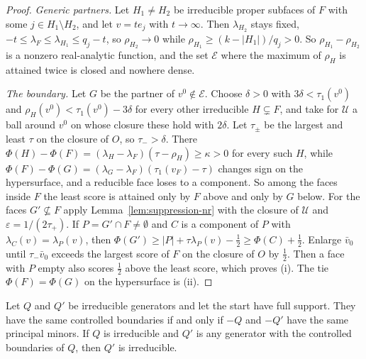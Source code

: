 \begin{proof}
\emph{Generic partners.} Let $H_1\ne H_2$ be irreducible proper subfaces of $F$ with some
$j\in H_1\setminus H_2$, and let $v=te_j$ with $t\to\infty$. Then $\lambda_{H_2}$ stays fixed,
$-t\le\lambda_F\le\lambda_{H_1}\le q_j-t$, so $\rho_{H_2}\to0$ while
$\rho_{H_1}\ge(k-|H_1|)/q_j>0$. So $\rho_{H_1}-\rho_{H_2}$ is a nonzero real-analytic function, and
the set $\mathcal E$ where the maximum of $\rho_H$ is attained twice is closed and nowhere dense.

\emph{The boundary.} Let $G$ be the partner of $v^0\notin\mathcal E$. Choose $\delta>0$ with
$3\delta<\tau_1(v^0)$ and $\rho_H(v^0)<\tau_1(v^0)-3\delta$ for every other irreducible
$H\subsetneq F$, and take for $\mathcal U$ a ball around $v^0$ on whose closure these hold with
$2\delta$. Let $\tau_\pm$ be the largest and least $\tau$ on the closure of $O$, so $\tau_->\delta$.
There $\Phi(H)-\Phi(F)=(\lambda_H-\lambda_F)(\tau-\rho_H)\ge\kappa>0$ for every such $H$, while
$\Phi(F)-\Phi(G)=(\lambda_G-\lambda_F)(\tau_1(v_F)-\tau)$ changes sign on the hypersurface, and a
reducible face loses to a component. So among the faces inside $F$ the least score is attained
only by $F$ above and only by $G$ below. For the faces $G'\not\subseteq F$ apply
Lemma~\ref{lem:suppression-nr} with the closure of $\mathcal U$ and $\varepsilon=1/(2\tau_+)$. If
$P=G'\cap F\ne\emptyset$ and $C$ is a component of $P$ with $\lambda_C(v)=\lambda_P(v)$, then
$\Phi(G')\ge|P|+\tau\lambda_P(v)-\frac12\ge\Phi(C)+\frac12$. Enlarge $\bar v_0$ until $\tau_-\bar
v_0$ exceeds the largest score of $F$ on the closure of $O$ by $\frac12$. Then a face with $P$
empty also scores $\frac12$ above the least score, which proves (i). The tie
$\Phi(F)=\Phi(G)$ on the hypersurface is (ii).
\end{proof}

\begin{theorem}\label{thm:modal}
Let $Q$ and $Q'$ be irreducible generators and let the start have full support. They have the
same controlled boundaries if and only if $-Q$ and $-Q'$ have the same principal minors. If $Q$ is
irreducible and $Q'$ is any generator with the controlled boundaries of $Q$, then $Q'$ is
irreducible.
\end{theorem}

